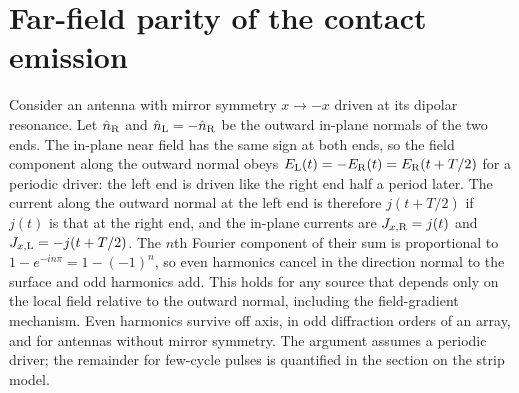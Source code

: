 \documentclass[aps,prl,onecolumn,superscriptaddress,notitlepage]{revtex4-2}
\begin{document}
\section{Far-field parity of the contact emission}
\label{sec:parity}
Consider an antenna with mirror symmetry $x\to-x$ driven at its dipolar resonance. Let $\hat n_{\rm R}$
and $\hat n_{\rm L}=-\hat n_{\rm R}$ be the outward in-plane normals of the two ends. The in-plane near
field has the same sign at both ends, so the field component along the outward normal obeys
$E_{\rm L}(t)=-E_{\rm R}(t)=E_{\rm R}(t+T/2)$ for a periodic driver: the left end is driven like the
right end half a period later. The current along the outward normal at the left end is therefore
$j(t+T/2)$ if $j(t)$ is that at the right end, and the in-plane currents are
$J_{x,{\rm R}}=j(t)$ and $J_{x,{\rm L}}=-j(t+T/2)$. The $n$th Fourier component of their sum is
proportional to $1-e^{-in\pi}=1-(-1)^n$, so even harmonics cancel in the direction normal to the
surface and odd harmonics add. This holds for any source that depends only on the local field
relative to the outward normal, including the field-gradient mechanism. Even harmonics survive off
axis, in odd diffraction orders of an array, and for antennas without mirror symmetry. The argument
assumes a periodic driver; the remainder for few-cycle pulses is quantified in the section on the
strip model.


\end{document}
